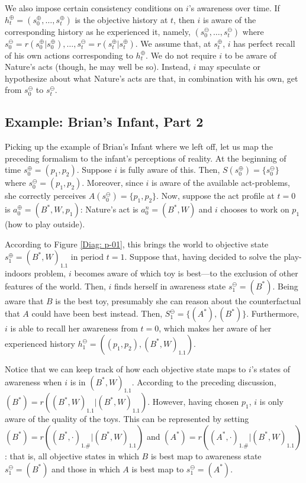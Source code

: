 \documentclass[
11pt,
titlepage,
reqno,
]{article}%
\theoremstyle{definition}
\begin{document}
We also impose certain consistency conditions on $i$'s awareness over time.
If $h^\oplus_t=(s^\oplus_0,\ldots,s^\oplus_t)$ is the objective history at $t$, then $i$ is aware of the corresponding history as he experienced it, namely, $(s^\ominus_0,\ldots,s^\ominus_t)$ where $s^\ominus_0=r(s^\oplus_0|s^\oplus_0),\ldots, s^\ominus_t=r(s^\oplus_t|s^\oplus_t)$.
We assume that, at $s^\oplus_t$, $i$ has perfect recall of his own actions corresponding to  $h^\oplus_t$.
We do not require $i$ to be aware of Nature's acts (though, he may well be so).
Instead, $i$ may speculate or hypothesize about what Nature's acts are that, in combination with his own, get from $s^\ominus_0$ to $s^\ominus_t$.

\subsection{Example: Brian's Infant, Part 2}	
Picking up the example of Brian's Infant where we left off, let us map the preceding formalism to the infant's perceptions of reality.
At the beginning of time $s^\oplus_0=(p_1,p_2)$.
Suppose $i$ is fully aware of this.
Then, $S(s^\oplus_0)=\{s^\ominus_0\}$ where $s^\ominus_0=(p_1,p_2)$.
Moreover, since $i$ is aware of the available act-problems, she correctly perceives $A(s^\ominus_0)=\{p_1,p_2\}$.
Now, suppose the act profile at $t=0$ is $a^\oplus_0=(B^\ast,W,p_1)$: Nature's act is $a^n_0=(B^\ast,W)$ and $i$ chooses to work on $p_1$ (how to play outside).

According to Figure \ref{Diag: p-01}, this brings the world to objective state $s^\oplus_1=(B^\ast,W)_{1.1}$ in period $t=1$.
Suppose that, having decided to solve the play-indoors problem, $i$ becomes aware of which toy is best---to the exclusion of other features of the world.
Then, $i$ finds herself in awareness state $s^\ominus_1=(B^\ast)$.
Being aware that $B$ is the best toy, presumably she can reason about the counterfactual that $A$ could have been best instead.
Then, $S^\ominus_1=\{(A^\ast),(B^\ast)\}$.
Furthermore, $i$ is able to recall her awareness from $t=0$, which makes her aware of her experienced history $h_1^\ominus=\left((p_1,p_2),(B^\ast,W)_{1.1}\right)$.

Notice that we can keep track of how each objective state maps to $i$'s states of awareness when $i$ is in $(B^\ast,W)_{1.1}$. 
According to the preceding discussion, $(B^\ast)=r((B^\ast,W)_{1.1}|(B^\ast,W)_{1.1})$.
However, having chosen $p_1$, $i$ is only aware of the quality of the toys.
This can be represented by setting $(B^\ast)=r((B^\ast,\cdot)_{1.\#}|(B^\ast,W)_{1.1})$ and $(A^\ast)=r((A^\ast,\cdot)_{1.\#}|(B^\ast,W)_{1.1})$: that is, all objective states in which $B$ is best map to awareness state $s^\ominus_1=(B^\ast)$ and those in which $A$ is best map to $s^\ominus_1=(A^\ast)$.
\end{document}

